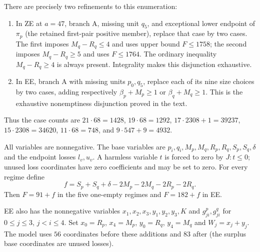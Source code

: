 \documentclass[11pt,a4paper]{article}
\theoremstyle{remark}
\begin{document}
There are precisely two refinements to this enumeration:
\begin{enumerate}
\item In ZE at $a=47$, branch A, missing unit $q_5$, and exceptional
lower endpoint of $\pi_p$ (the retained first-pair positive member),
replace that case by two cases. The first imposes $M_q-R_q\leq4$ and
uses upper bound $F\leq1758$; the second imposes $M_q-R_q\geq5$ and
uses $F\leq1764$. The ordinary inequality $M_q-R_q\geq4$ is always
present. Integrality makes this disjunction exhaustive.
\item In EE, branch A with missing units $p_0,q_5$, replace each of its
nine size choices by two cases, adding respectively
$\beta_p+M_p\geq1$ or $\beta_q+M_q\geq1$.
This is the exhaustive nonemptiness disjunction proved in the text.
\end{enumerate}
Thus the case counts are
$21\cdot68=1428$, $19\cdot68=1292$, $17\cdot2308+1=39237$,
$15\cdot2308=34620$, $11\cdot68=748$, and $9\cdot547+9=4932$.

All variables are nonnegative. The base variables are
$p_i,q_i,M_p,M_q,R_p,R_q,S_p,S_q,\delta$ and the endpoint losses
$l_v,u_v$. A harmless variable $t$ is forced to zero by $J:t\leq0$;
unused loss coordinates have zero coefficients and may be set to zero.
For every regime define
\[
 f=S_p+S_q+\delta-2M_p-2M_q-2R_p-2R_q.
\]
Then $F=91+f$ in the five one-empty regimes and $F=182+f$ in EE.

EE also has the nonnegative variables $x_1,x_2,x_3,y_1,y_2,y_3,K$
and $g^p_{ji},g^q_{ji}$ for $0\leq j\leq3$, $j<i\leq4$.
Set $x_0=R_p$, $x_4=M_p$, $y_0=R_q$, $y_4=M_q$ and $W_j=x_j+y_j$.
The model uses $56$ coordinates before these additions and $83$ after
(the surplus base coordinates are unused losses).
\end{document}
